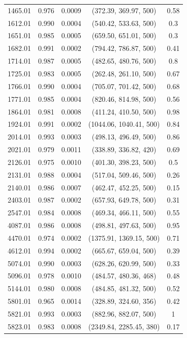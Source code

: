 \documentclass[fleqn,usenatbib, onecolumn,dvipdfmx]{mnras}
\begin{document}
\begin{center}
\begin{tabular}{|c|c|c|c|c|}
1465.01 & 0.976 & 0.0009 & (372.39, 369.97, 500) & 0.58 \\
1612.01 & 0.990 & 0.0004 & (540.42, 533.63, 500) & 0.3 \\
1651.01 & 0.985 & 0.0005 & (659.50, 651.01, 500) & 0.3 \\
1682.01 & 0.991 & 0.0002 & (794.42, 786.87, 500) & 0.41 \\
1714.01 & 0.987 & 0.0005 & (482.65, 480.76, 500) & 0.8 \\
1725.01 & 0.983 & 0.0005 & (262.48, 261.10, 500) & 0.67 \\
1766.01 & 0.990 & 0.0004 & (705.07, 701.42, 500) & 0.68 \\
1771.01 & 0.985 & 0.0004 & (820.46, 814.98, 500) & 0.56 \\
1864.01 & 0.981 & 0.0008 & (411.24, 410.50, 500) & 0.98 \\
1924.01 & 0.991 & 0.0002 & (1044.06, 1040.41, 500) & 0.84 \\
2014.01 & 0.993 & 0.0003 & (498.13, 496.49, 500) & 0.86 \\
2021.01 & 0.979 & 0.0011 & (338.89, 336.82, 420) & 0.69 \\
2126.01 & 0.975 & 0.0010 & (401.30, 398.23, 500) & 0.5 \\
2131.01 & 0.988 & 0.0004 & (517.04, 509.46, 500) & 0.26 \\
2140.01 & 0.986 & 0.0007 & (462.47, 452.25, 500) & 0.15 \\
2403.01 & 0.987 & 0.0002 & (657.93, 649.78, 500) & 0.31 \\
2547.01 & 0.984 & 0.0008 & (469.34, 466.11, 500) & 0.55 \\
4087.01 & 0.986 & 0.0008 & (498.81, 497.63, 500) & 0.95 \\
4470.01 & 0.974 & 0.0002 & (1375.91, 1369.15, 500) & 0.71 \\
4612.01 & 0.994 & 0.0002 & (665.67, 659.04, 500) & 0.39 \\
5074.01 & 0.990 & 0.0003 & (628.26, 620.99, 500) & 0.33 \\
5096.01 & 0.978 & 0.0010 & (484.57, 480.36, 468) & 0.48 \\
5144.01 & 0.980 & 0.0008 & (484.85, 481.32, 500) & 0.52 \\
5801.01 & 0.965 & 0.0014 & (328.89, 324.60, 356) & 0.42 \\
5821.01 & 0.993 & 0.0003 & (882.96, 882.07, 500) & 1 \\
5823.01 & 0.983 & 0.0008 & (2349.84, 2285.45, 380) & 0.17 \\



\hline
\end{tabular}
\end{center}
\end{document}

